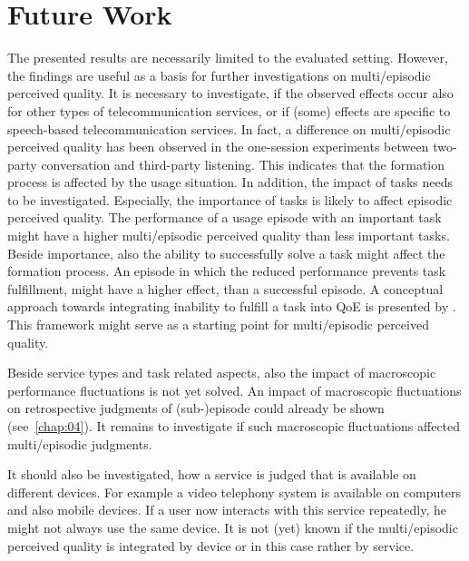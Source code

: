\section{Future Work}
The presented results are necessarily limited to the evaluated setting.
However, the findings are useful as a basis for further investigations on multi\-/episodic perceived quality.
It is necessary to investigate, if the observed effects occur also for other types of telecommunication services, or if (some) effects are specific to speech-based telecommunication services.
In fact, a difference on multi\-/episodic perceived quality has been observed in the one-session experiments between two-party conversation and third-party listening.
This indicates that the formation process is affected by the usage situation.
In addition, the impact of tasks needs to be investigated.
Especially, the importance of tasks is likely to affect episodic perceived quality.
The performance of a usage episode with an important task might have a higher multi\-/episodic perceived quality than less important tasks.
Beside importance, also the ability to successfully solve a task might affect the formation process.
An episode in which the reduced performance prevents task fulfillment, might have a higher effect, than a successful episode.
A conceptual approach towards integrating inability to fulfill a task into \ac{QoE} is presented by \citet{leon-garcia_generalizing_2014}.
This framework might serve as a starting point for multi\-/episodic perceived quality.

Beside service types and task related aspects, also the impact of macroscopic performance fluctuations is not yet solved.
An impact of macroscopic fluctuations on retrospective judgments of (sub-)episode could already be shown (see~\autoref{chap:04}).
It remains to investigate if such macroscopic fluctuations affected multi\-/episodic judgments.

It should also be investigated, how a service is judged that is available on different devices.
For example a video telephony system is available on computers and also mobile devices.
If a user now interacts with this service repeatedly, he might not always use the same device.
It is not (yet) known if the multi\-/episodic perceived quality is integrated by device or in this case rather by service.